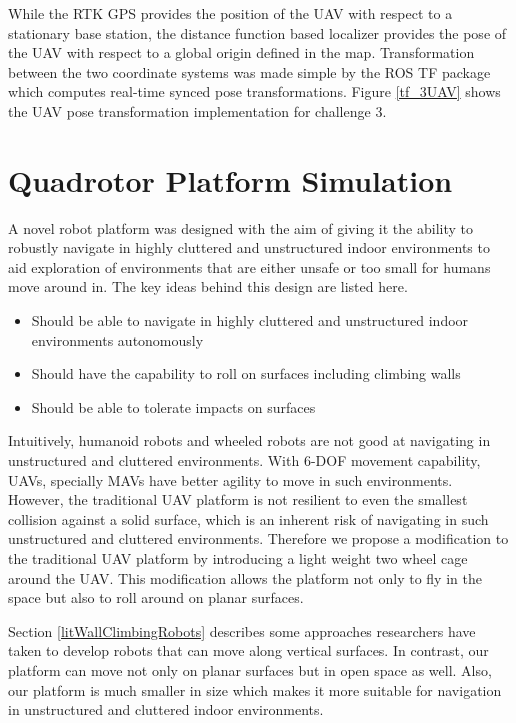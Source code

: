 \documentclass[12pt,a4paper]{report}
\begin{document}
While the RTK GPS provides the position of the UAV with respect to a stationary base station, the distance function based localizer provides the pose of the UAV with respect to a global origin defined in the map. Transformation between the two coordinate systems was made simple by the ROS TF package which computes real-time synced pose transformations. Figure \ref{tf_3UAV} shows the UAV pose transformation implementation for challenge 3.

\section{Quadrotor Platform Simulation}
\label{platformSimProgress}
A novel robot platform was designed with the aim of giving it the ability to robustly navigate in highly cluttered and unstructured indoor environments to aid exploration of environments that are either unsafe or too small for humans move around in. The key ideas behind this design are listed here.

\begin{itemize}
\item Should be able to navigate in highly cluttered and unstructured indoor environments autonomously
\item Should have the capability to roll on surfaces including climbing walls
\item Should be able to tolerate impacts on surfaces
\end{itemize}

Intuitively, humanoid robots and wheeled robots are not good at navigating in unstructured and cluttered environments. With 6-DOF movement capability, UAVs, specially MAVs have better agility to move in such environments. However, the traditional UAV platform is not resilient to even the smallest collision against a solid surface, which is an inherent risk of navigating in such unstructured and cluttered environments. Therefore we propose a modification to the traditional UAV platform by introducing a light weight two wheel cage around the UAV. This modification allows the platform not only to fly in the space but also to roll around on planar surfaces.\par

Section \ref{litWallClimbingRobots} describes some approaches researchers have taken to develop robots that can move along vertical surfaces. In contrast, our platform can move not only on planar surfaces but in open space as well. Also, our platform is much smaller in size which makes it more suitable for navigation in unstructured and cluttered indoor environments. \par
\end{document}
